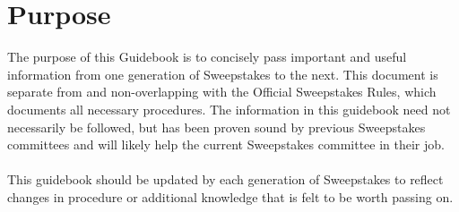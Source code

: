 \chapter{Purpose}
\label{ch:Purpose}

The purpose of this Guidebook is to concisely pass important and useful
information from one generation of Sweepstakes to the next. This document is
separate from and non-overlapping with the Official Sweepstakes Rules, which
documents all necessary procedures. The information in this guidebook need
not necessarily be followed, but has been proven sound by previous Sweepstakes
committees and will likely help the current Sweepstakes committee in their job.
\\\\
This guidebook should be updated by each generation of Sweepstakes to reflect
changes in procedure or additional knowledge that is felt to be worth
passing on.
